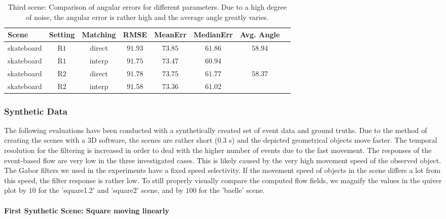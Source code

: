 \begin{table}[tb]
	\centering
		\begin{tabular}{lccccccc}
Scene & Setting & Matching & RMSE & MeanErr & MedianErr & Avg. Angle \\
\hline  \hline
skateboard & R$1$ & direct & $91.93$ & $73.85$ & $61.86$ & $58.94$ & \\
skateboard & R$1$ & interp & $91.75$ & $73.47$ & $60.94$ &  & \\
skateboard & R$2$ & direct & $91.78$ & $73.75$ & $61.77$ & $58.37$ & \\
skateboard & R$2$ & interp & $91.58$ & $73.36$ & $61.02$ &  & \\
		\end{tabular}
	\caption[Third scene: Comparison of angular errors for different parameters.]{Third scene: Comparison of angular errors for different parameters. 
	Due to a high degree of noise, the angular error is rather high and the average angle greatly varies.}
	\label{tab:error_comparison_skateboard}
\end{table}

\subsubsection{Synthetic Data}

The following evaluations have been conducted with a synthetically created set of event data and ground truths.
Due to the method of creating the scenes with a 3D software, the scenes are rather short ($0.3$ s) and the depicted geometrical objects move faster.
The temporal resolution for the filtering is increased in order to deal with the higher number of events due to the fast movement.
The responses of the event-based flow are very low in the three investigated cases. 
This is likely caused by the very high movement speed of the observed object.
The Gabor filters we used in the experiments have a fixed speed selectivity. 
If the movement speed of objects in the scene differs a lot from this speed, the filter response is rather low.
To still properly visually compare the computed flow fields, we magnify the values in the quiver plot by $10$ for the 'square1.2' and 'square2' scene, and by $100$ for the 'baelle' scene.

\paragraph{First Synthetic Scene: Square moving linearly}


